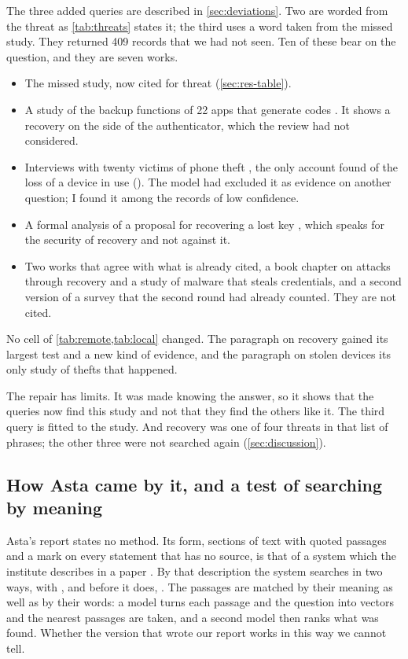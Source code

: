 The three added queries are described in \cref{sec:deviations}.
Two are worded from the threat as \cref{tab:threats} states it; the
third uses a word taken from the missed study.
They returned 409 records that we had not seen.
Ten of these bear on the question, and they are seven works.
\begin{itemize}
  \item The missed study, now cited for threat 
    (\cref{sec:res-table}).
  \item A study of the backup functions of 22 apps that generate codes
    \autocite{Gilsenan2023TOTPApps}.
    It shows a recovery on the side of the authenticator, which the
    review had not considered.
  \item Interviews with twenty victims of phone theft
    \autocite{Bhardwaj2025PhoneTheft}, the only account found of the
    loss of a device in use ().
    The model had excluded it as evidence on another question; I found
    it among the records of low confidence.
  \item A formal analysis of a proposal for recovering a lost key
    \autocite[\abso]{Frymann2020ARKG}, which speaks for the security
    of recovery and not against it.
  \item Two works that agree with what is already cited, a book chapter
    on attacks through recovery and a study of malware that steals
    credentials, and a second version of a survey that the second round
    had already counted.
    They are not cited.
\end{itemize}
No cell of \cref{tab:remote,tab:local} changed.
The paragraph on recovery gained its largest test and a new kind of
evidence, and the paragraph on stolen devices its only study of thefts
that happened.

The repair has limits.
It was made knowing the answer, so it shows that the queries now find
this study and not that they find the others like it.
The third query is fitted to the study.
And recovery was one of four threats in that list of phrases; the
other three were not searched again (\cref{sec:discussion}).

\subsection{How Asta came by it, and a test of searching by meaning}

Asta's report states no method.
Its form, sections of text with quoted passages and a mark on every
statement that has no source, is that of a system which the institute
describes in a paper \autocite{Singh2025ScholarQA}.
By that description the system searches in two ways, with
, and before it does,
.
The passages are matched by their meaning as well as by their words: a
model turns each passage and the question into vectors and the nearest
passages are taken, and a second model then ranks what was found.
Whether the version that wrote our report works in this way we cannot
tell.

